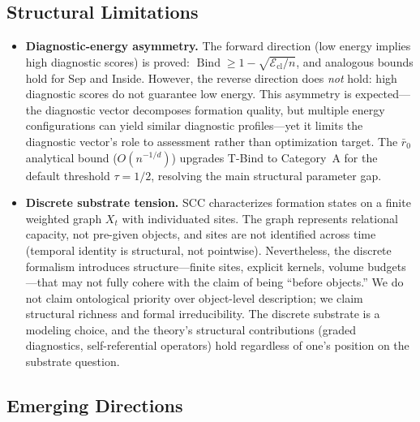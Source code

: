 \documentclass[lettersize,journal]{IEEEtran}
\DeclareMathOperator{\Bind}{Bind}
\begin{document}
\subsection{Structural Limitations}

\begin{itemize}
\item \textbf{Diagnostic-energy asymmetry.} The forward direction (low energy implies high diagnostic scores) is proved: $\Bind \geq 1 - \sqrt{\mathcal{E}_{\mathrm{cl}}/n}$, and analogous bounds hold for Sep and Inside. However, the reverse direction does \emph{not} hold: high diagnostic scores do not guarantee low energy. This asymmetry is expected---the diagnostic vector decomposes formation quality, but multiple energy configurations can yield similar diagnostic profiles---yet it limits the diagnostic vector's role to assessment rather than optimization target. The $\bar{r}_0$ analytical bound ($O(n^{-1/d})$) upgrades T-Bind to Category~A for the default threshold $\tau = 1/2$, resolving the main structural parameter gap.

\item \textbf{Discrete substrate tension.} SCC characterizes formation states on a finite weighted graph $X_t$ with individuated sites. The graph represents relational capacity, not pre-given objects, and sites are not identified across time (temporal identity is structural, not pointwise). Nevertheless, the discrete formalism introduces structure---finite sites, explicit kernels, volume budgets---that may not fully cohere with the claim of being ``before objects.'' We do not claim ontological priority over object-level description; we claim structural richness and formal irreducibility. The discrete substrate is a modeling choice, and the theory's structural contributions (graded diagnostics, self-referential operators) hold regardless of one's position on the substrate question.
\end{itemize}

\subsection{Emerging Directions}
\end{document}
